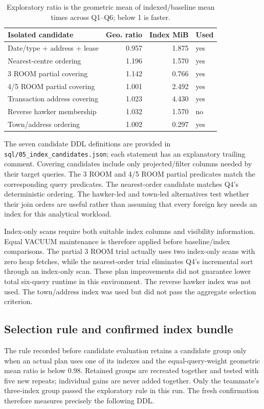 \begin{table}[H]\centering\small
\begin{tabular}{lrrl}
\toprule
Isolated candidate & Geo. ratio & Index MiB & Used \\
\midrule
Date/type + address + lease & 0.957 & 1.875 & yes \\
Nearest-centre ordering & 1.196 & 1.570 & yes \\
3 ROOM partial covering & 1.142 & 0.766 & yes \\
4/5 ROOM partial covering & 1.001 & 2.492 & yes \\
Transaction address covering & 1.023 & 4.430 & yes \\
Reverse hawker membership & 1.032 & 1.570 & no \\
Town/address ordering & 1.002 & 0.297 & yes \\
\bottomrule
\end{tabular}
\caption{Exploratory ratio is the geometric mean of indexed/baseline mean times across Q1--Q6; below 1 is faster.}
\end{table}

The seven candidate DDL definitions are provided in \texttt{sql/05\_index\_candidates.json}; each statement has an explanatory trailing comment. Covering candidates include only projected/filter columns needed by their target queries. The 3 ROOM and 4/5 ROOM partial predicates match the corresponding query predicates. The nearest-order candidate matches Q4's deterministic ordering. The hawker-led and town-led alternatives test whether their join orders are useful rather than assuming that every foreign key needs an index for this analytical workload.

Index-only scans require both suitable index columns and visibility information. Equal VACUUM maintenance is therefore applied before baseline/index comparisons. The partial 3 ROOM trial actually uses two index-only scans with zero heap fetches, while the nearest-order trial eliminates Q4's incremental sort through an index-only scan. These plan improvements did not guarantee lower total six-query runtime in this environment. The reverse hawker index was not used. The town/address index was used but did not pass the aggregate selection criterion.

\subsection{Selection rule and confirmed index bundle}
The rule recorded before candidate evaluation retains a candidate group only when an actual plan uses one of its indexes and the equal-query-weight geometric mean ratio is below 0.98. Retained groups are recreated together and tested with five new repeats; individual gains are never added together. Only the teammate's three-index group passed the exploratory rule in this run. The fresh confirmation therefore measures precisely the following DDL.


